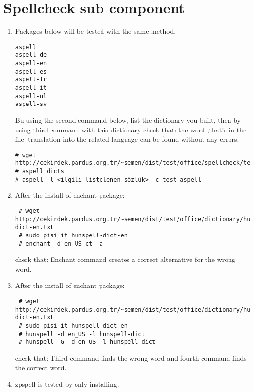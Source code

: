 \documentclass[a4paper,10pt]{article}
\begin{document}
\section{ Spellcheck sub component}
\begin{enumerate}
\item Packages below will be tested with the same method.
\begin{verbatim}
aspell
aspell-de
aspell-en
aspell-es
aspell-fr
aspell-it
aspell-nl
aspell-sv 
\end{verbatim}

Bu using the second command below, list the dictionary you built, then by using third command with this dictionary check that: the word ,that's in the file, translation  into the related language can be found without any errors.
\begin{verbatim}
# wget http://cekirdek.pardus.org.tr/~semen/dist/test/office/spellcheck/test_aspell
# aspell dicts
# aspell -l <ilgili listelenen sözlük> -c test_aspell
\end{verbatim}
\item After the install of enchant package:
\begin{verbatim}
 # wget http://cekirdek.pardus.org.tr/~semen/dist/test/office/dictionary/hunspell-dict-en.txt
 # sudo pisi it hunspell-dict-en
 # enchant -d en_US ct -a
\end{verbatim}
check that: Enchant command creates a correct alternative for the wrong word.

\item After the install of enchant package:
\begin{verbatim}
 # wget http://cekirdek.pardus.org.tr/~semen/dist/test/office/dictionary/hunspell-dict-en.txt
 # sudo pisi it hunspell-dict-en
 # hunspell -d en_US -l hunspell-dict
 # hunspell -G -d en_US -l hunspell-dict
\end{verbatim}
check that: Third command finds the wrong word and fourth command finds the correct word.

\item zpspell is tested by only installing.
\end{enumerate}
\end{document}
